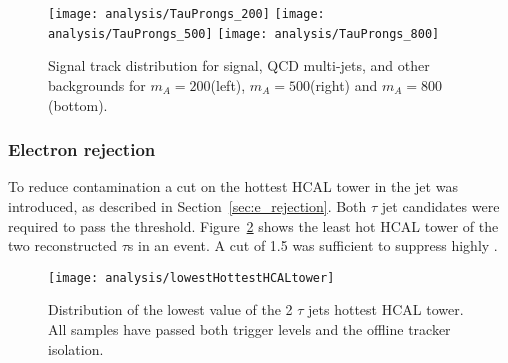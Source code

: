 \begin{figure}[tb]
\centering
\texttt{[image: analysis/TauProngs\_200]}
\texttt{[image: analysis/TauProngs\_500]}
\texttt{[image: analysis/TauProngs\_800]}
\caption{Signal track distribution for signal, QCD multi-jets, \Ztautau\xspace and other backgrounds for $m_{A}=200$\GeVcc (left), $m_{A}=500$\GeVcc (right) and $m_{A}=800$\GeVcc (bottom).\label{fig:sig_cone}}
\end{figure}


\subsubsection{Electron rejection}
To reduce \Zee\xspace contamination a cut on the hottest HCAL tower in the jet was introduced, as described in Section~\ref{sec:e_rejection}. Both $\tau$ jet candidates were required to pass the threshold. Figure~\ref{fig:lowHotHcal} shows the least hot HCAL tower of the two reconstructed $\tau$s in an event. A cut of 1.5 \GeV was sufficient to suppress highly \Zee\xspace.

\begin{figure}[!Hhtb]
\centering
\texttt{[image: analysis/lowestHottestHCALtower]}
\caption{Distribution of the lowest value of the 2 $\tau$ jets hottest HCAL tower. All samples have passed both trigger levels and the offline tracker isolation.\label{fig:lowHotHcal}}
\end{figure}

